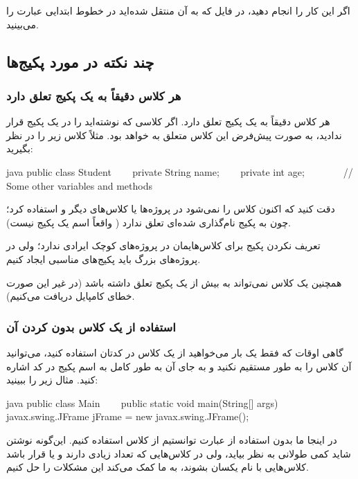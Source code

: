 اگر این کار را انجام دهید، در فایل  که به آن
منتقل شده‌اید در خطوط ابتدایی عبارت  را
می‌بینید.

\subsection{چند نکته در مورد پکیج‌ها}

\subsubsection{هر کلاس دقیقاً به یک پکیج تعلق دارد}

هر کلاس دقیقاً به یک پکیج تعلق دارد. اگر کلاسی که نوشته‌اید را در یک پکیج
قرار ندادید، به صورت پیش‌فرض این کلاس متعلق به  خواهد
بود. مثلاً کلاس زیر را در نظر بگیرید:

\begin{codebox}{java}
public class Student {
    private String name;
    private int age;
    
    // Some other variables and methods
}
\end{codebox}

دقت کنید که اکنون کلاس  را نمی‌شود در پروژه‌ها یا
کلاس‌های دیگر  و استفاده کرد؛ چون به پکیج نام‌گذاری
شده‌ای تعلق ندارد (  واقعاً اسم یک پکیج نیست).

تعریف نکردن پکیج برای کلاس‌هایمان در پروژه‌های کوچک ایرادی ندارد؛ ولی در
پروژه‌های بزرگ باید پکیج‌های مناسبی ایجاد کنیم.

همچنین یک کلاس نمی‌تواند به بیش از یک پکیج تعلق داشته باشد (در غیر این
صورت خطای کامپایل دریافت می‌کنیم).

\subsubsection{استفاده از یک کلاس بدون  کردن آن}

گاهی اوقات که فقط یک بار می‌خواهید از یک کلاس در کدتان استفاده کنید،
می‌توانید آن کلاس را به طور مستقیم  نکنید و به جای آن به طور
کامل به اسم پکیج در کد اشاره کنید. مثال زیر را ببینید:

\begin{codebox}{java}
public class Main {
    public static void main(String[] args) {  
        javax.swing.JFrame jFrame = new javax.swing.JFrame();  
    }  
}
\end{codebox}

در اینجا ما بدون استفاده از عبارت
 توانستیم از کلاس
 استفاده کنیم. این‌گونه نوشتن شاید کمی طولانی به نظر
بیاید، ولی در کلاس‌هایی که تعداد زیادی  دارند و یا
قرار باشد کلاس‌هایی با نام یکسان  بشوند، به ما کمک
می‌کند این مشکلات را حل کنیم.


